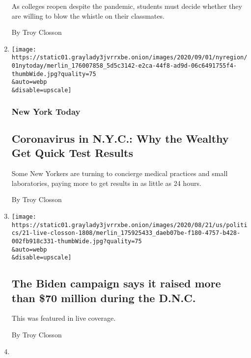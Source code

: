\begin{enumerate}
  As colleges reopen despite the pandemic, students must decide whether
  they are willing to blow the whistle on their classmates.

  By Troy Closson
\item
  \href{/2020/09/01/nyregion/coronavirus-test-results-nyc.html}{}

  \texttt{[image: https://static01.graylady3jvrrxbe.onion/images/2020/09/01/nyregion/01nytoday/merlin\_176007858\_5d5c3142-e2ca-44f8-ad9d-06c6491755f4-thumbWide.jpg?quality=75\\\&auto=webp\\\&disable=upscale]}

  \hypertarget{new-york-today-2}{%
  \subsubsection{New York Today}\label{new-york-today-2}}

  \hypertarget{coronavirus-in-nyc-why-the-wealthy-get-quick-test-results}{%
  \subsection{Coronavirus in N.Y.C.: Why the Wealthy Get Quick Test
  Results}\label{coronavirus-in-nyc-why-the-wealthy-get-quick-test-results}}

  Some New Yorkers are turning to concierge medical practices and small
  laboratories, paying more to get results in as little as 24 hours.

  By Troy Closson
\item
  \href{/live/2020/08/21/us/dnc-convention-election/the-biden-campaign-says-it-raised-more-than-70-million-during-the-dnc}{}

  \texttt{[image: https://static01.graylady3jvrrxbe.onion/images/2020/08/21/us/politics/21-live-closson-1808/merlin\_175925433\_daeb07be-f180-4757-b428-002fb918c331-thumbWide.jpg?quality=75\\\&auto=webp\\\&disable=upscale]}

  \hypertarget{the-biden-campaign-says-it-raised-more-than-70-million-during-the-dnc}{%
  \subsection{The Biden campaign says it raised more than \$70 million
  during the
  D.N.C.}\label{the-biden-campaign-says-it-raised-more-than-70-million-during-the-dnc}}

  This was featured in live coverage.

  By Troy Closson
\item
  \href{/2020/08/19/nyregion/nj-election-mail-voting-fraud.html}{}


\end{enumerate}
